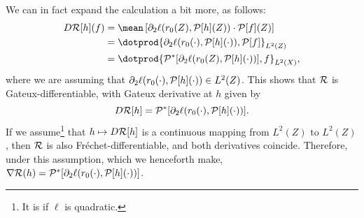 We can in fact expand the calculation a bit more, as follows:
\begin{align*}
    D \risk [ h ] ( f )
    &= \mean \left[
        \partial_{ 2 } \ell ( r_{ 0 } ( Z ), \meanop [ h ] ( Z ) ) \cdot \meanop [ f ] ( Z )
    \right] \\
    &= \dotprod{ \partial_{ 2 } \ell ( r_{ 0 } ( \cdot ), \meanop [ h ] ( \cdot ) ), \meanop [ f ] }_{ L^{ 2 } ( Z ) } \\
    &= \dotprod{ \meanop^{ * } [ \partial_{ 2 } \ell ( r_{ 0 } ( Z ), \meanop [ h ] ( \cdot ) ) ], f }_{ L^{ 2 } ( X ) }
,\end{align*}
where we are assuming that $ \partial_{ 2 } \ell ( r_{ 0 } ( \cdot ), \mathcal{P} [ h ] ( \cdot ) ) \in L^{ 2 } ( Z ) $.
This shows that $ \mathcal{R} $ is Gateux-differentiable, with Gateux derivative at $ h $ given by
\begin{equation*}
    D \mathcal{R} [ h ] = \mathcal{P}^{ * } [ \partial_{ 2 } \ell ( r_{ 0 } ( \cdot ), \mathcal{P} [ h ] ( \cdot ) ) ]
.\end{equation*}
If we assume\footnote{It is if $ \ell $ is quadratic.} that $ h \mapsto D \mathcal{R} [ h ] $ is a continuous mapping from $ L^{ 2 } ( Z ) $ to $ L^{ 2 } ( Z ) $, then $ \mathcal{R} $ is also Fréchet-differentiable, and both derivatives coincide.
Therefore, under this assumption, which we henceforth make, $ \nabla \mathcal{R} ( h ) = \mathcal{P}^{ * } [ \partial_{ 2 } \ell ( r_{ 0 } ( \cdot ), \mathcal{P} [ h ] ( \cdot ) ) ] $.
